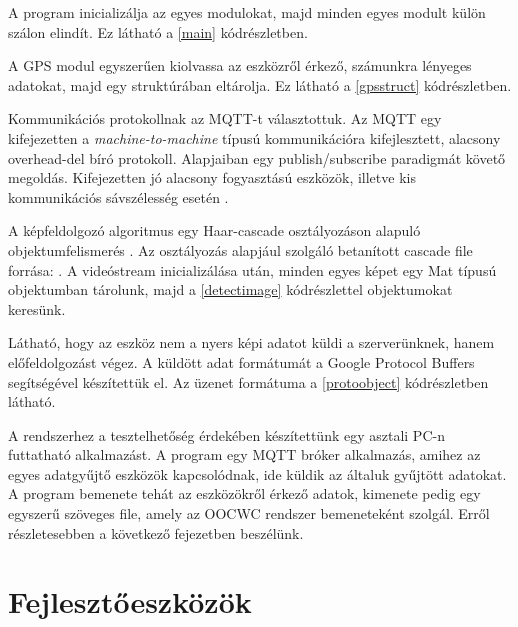 \documentclass[a4paper,12pt]{report}
\begin{document}
A program inicializálja az egyes modulokat, majd minden egyes modult külön szálon elindít. Ez látható a \ref{main} kódrészletben.



A GPS modul egyszerűen kiolvassa az eszközről érkező, számunkra lényeges adatokat, majd egy struktúrában eltárolja. Ez látható a \ref{gpsstruct} kódrészletben.



Kommunikációs protokollnak az MQTT-t választottuk. Az MQTT egy kifejezetten a \emph{machine-to-machine} típusú kommunikációra kifejlesztett, alacsony overhead-del bíró protokoll. Alapjaiban egy publish/subscribe paradigmát követő megoldás. Kifejezetten jó alacsony fogyasztású eszközök, illetve kis kommunikációs sávszélesség esetén \cite{mqtt}. 

A képfeldolgozó algoritmus egy Haar-cascade osztályozáson alapuló objektumfelismerés \cite{violacascade} \cite{haaremp}. Az osztályozás alapjául szolgáló betanított cascade file forrása: \cite{cascade}. A videóstream inicializálása után, minden egyes képet egy Mat típusú objektumban tárolunk, majd a \ref{detectimage} kódrészlettel objektumokat keresünk. 



Látható, hogy az eszköz nem a nyers képi adatot küldi a szerverünknek, hanem előfeldolgozást végez. A küldött adat formátumát a Google Protocol Buffers segítségével készítettük el. Az üzenet formátuma a \ref{protoobject} kódrészletben látható. 



A rendszerhez a tesztelhetőség érdekében készítettünk egy asztali PC-n futtatható alkalmazást. A program egy MQTT bróker alkalmazás, amihez az egyes adatgyűjtő eszközök kapcsolódnak, ide küldik az általuk gyűjtött adatokat. A program bemenete tehát az eszközökről érkező adatok, kimenete pedig egy egyszerű szöveges file, amely az OOCWC rendszer bemeneteként szolgál. Erről részletesebben a következő fejezetben beszélünk.

\section{Fejlesztőeszközök}
\label{dev}
\end{document}
